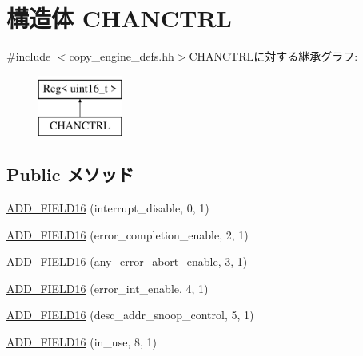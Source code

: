 \hypertarget{structCopyEngineReg_1_1ChanRegs_1_1CHANCTRL}{
\section{構造体 CHANCTRL}
\label{structCopyEngineReg_1_1ChanRegs_1_1CHANCTRL}
}


{\ttfamily \#include $<$copy\_\-engine\_\-defs.hh$>$}CHANCTRLに対する継承グラフ:\begin{figure}[H]
\begin{center}
\leavevmode
\includegraphics[height=2cm]{structCopyEngineReg_1_1ChanRegs_1_1CHANCTRL}
\end{center}
\end{figure}
\subsection*{Public メソッド}
\begin{DoxyCompactItemize}
\item 
\hyperlink{structCopyEngineReg_1_1ChanRegs_1_1CHANCTRL_afbf456ae645863ac805170ed38779357}{ADD\_\-FIELD16} (interrupt\_\-disable, 0, 1)
\item 
\hyperlink{structCopyEngineReg_1_1ChanRegs_1_1CHANCTRL_a2da4e0122cfedaf906db744611e1e1d6}{ADD\_\-FIELD16} (error\_\-completion\_\-enable, 2, 1)
\item 
\hyperlink{structCopyEngineReg_1_1ChanRegs_1_1CHANCTRL_a4a1b4324645a925840d454da73f4ea60}{ADD\_\-FIELD16} (any\_\-error\_\-abort\_\-enable, 3, 1)
\item 
\hyperlink{structCopyEngineReg_1_1ChanRegs_1_1CHANCTRL_afbe23d9c42e06621fe3627825f9d4e8d}{ADD\_\-FIELD16} (error\_\-int\_\-enable, 4, 1)
\item 
\hyperlink{structCopyEngineReg_1_1ChanRegs_1_1CHANCTRL_aa9ef497ce7107ddbf41d05d5e5937a14}{ADD\_\-FIELD16} (desc\_\-addr\_\-snoop\_\-control, 5, 1)
\item 
\hyperlink{structCopyEngineReg_1_1ChanRegs_1_1CHANCTRL_a76b6e048cfee8b6a1d8c211e201f5523}{ADD\_\-FIELD16} (in\_\-use, 8, 1)
\end{DoxyCompactItemize}


